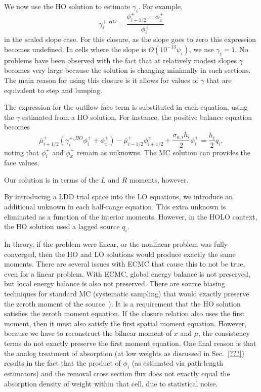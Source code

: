 We now use the HO solution to estimate $\gamma_i$.  For example, 
\begin{equation}
    \gamma_i^{+,HO} = \frac{\phi_{i+1/2}^+ - \phi_x^+}{\phi_i^+}
\end{equation}
in the scaled slope case.  For this closure, as the slope goes to zero this expression
becomes undefined.  In cells where the slope is $O(10^{-13} \psi_i)$, we use $\gamma_i=1$.
No problems have been observed with the fact that at relatively modest slopes $\gamma$
becomes very large because the solution is changing minimally in such sections. 
The main reason for using this closure is it allows for values of $\gamma$ that are equivalent to step and lumping.

The expression for the outflow face term is substituted in each equation, using the
$\gamma$ estimated from a HO solution.
For instance, the positive balance equation becomes
\begin{equation}
    \overline\mu^+_{i+1/2}\left( \gamma_i^{+,HO} \phi_i^+ + \phi_x^+ \right) - \overline\mu^+_{i-1/2}\phi_{i+1/2}^+ +
    \frac{\sigma_{a,i}h_i}{2} \phi_i^+ = \frac{h_i}{2} q_i,
    \label{eqn:clsd_posbal}
\end{equation}
noting that $\phi_i^+$ and $\phi_x^+$ remain as unknowns. The MC solution can provides the
face values.

Our solution is in terms of the $L$ and $R$ moments, however.



By introducing a LDD trial space into the LO equations, we introduce an additional
unknown in each half-range equation.  This extra unknown is eliminated as a function
of the interior moments.  
However, in the HOLO context, the HO solution used a lagged source $q_i$.

In theory, if the problem were linear, or the nonlinear problem was fully converged,
then the HO and LO solutions would produce exactly the same moments.  There are
several issues with ECMC that cause this to not be true, even for a linear problem.
With ECMC, global energy balance is not preserved, but local energy balance is also
not preserved.  There are source biasing techniques for standard MC (systematic
sampling) that would exactly preserve the zeroth moment of the source~\cite{shultis_mc}). 
It is a requirement that the HO solution satisfies the zeroth moment equation. If the
closure relation also uses the first moment, then it must also satisfy the first
spatial moment equation.  However, because we have to reconstruct the bilnear moment
of $x$ and $\mu$, the consistency terms do not exactly preserve the first moment
equation.  One final reason is that the analog treatment of absorption (at low
weights as discussed in Sec.~\ref{???}) results in the fact that the product of
$\phi_i$ (as estimated via path-length estimators) and the removal cross section 
flux does not exactly equal the absorption density of weight within that cell, due to
statistical noise.  
